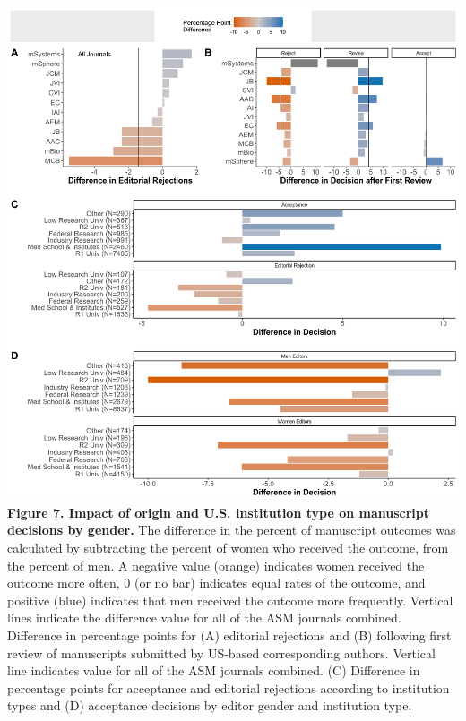 \documentclass[11pt,]{article}
\begin{document}
\includegraphics{Figure_7.png} \textbf{Figure 7. Impact of origin and
U.S. institution type on manuscript decisions by gender.} The difference
in the percent of manuscript outcomes was calculated by subtracting the
percent of women who received the outcome, from the percent of men. A
negative value (orange) indicates women received the outcome more often,
0 (or no bar) indicates equal rates of the outcome, and positive (blue)
indicates that men received the outcome more frequently. Vertical lines
indicate the difference value for all of the ASM journals combined.
Difference in percentage points for (A) editorial rejections and (B)
following first review of manuscripts submitted by US-based
corresponding authors. Vertical line indicates value for all of the ASM
journals combined. (C) Difference in percentage points for acceptance
and editorial rejections according to institution types and (D)
acceptance decisions by editor gender and institution type.

\newpage
\end{document}
